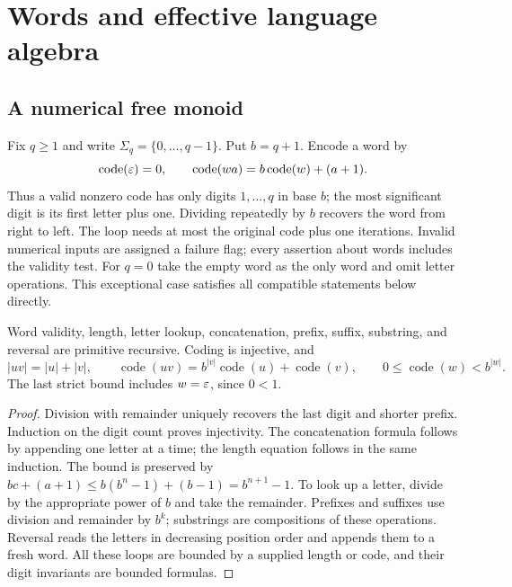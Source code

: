 \section{Words and effective language algebra}
\label{sec:words}

\subsection{A numerical free monoid}

Fix $q\ge1$ and write $\Sigma_q=\{0,\ldots,q-1\}$. Put $b=q+1$.
Encode a word by
\[
 \operatorname{code}(\varepsilon)=0,\qquad
 \operatorname{code}(wa)=b\operatorname{code}(w)+(a+1).
\]
Thus a valid nonzero code has only digits $1,\ldots,q$ in base $b$;
the most significant digit is its first letter plus one. Dividing repeatedly
by $b$ recovers the word from right to left. The loop needs at most the
original code plus one iterations. Invalid numerical inputs are assigned
a failure flag; every assertion about words includes the validity test.
For $q=0$ take the empty word as the only word and omit letter operations.
This exceptional case satisfies all compatible statements below directly.

\begin{lemma}\label{word:code}
Word validity, length, letter lookup, concatenation, prefix, suffix,
substring, and reversal are primitive recursive. Coding is injective, and
\[
 |uv|=|u|+|v|,\qquad
 \operatorname{code}(uv)=b^{|v|}\operatorname{code}(u)+
                          \operatorname{code}(v),\qquad
 0\le\operatorname{code}(w)<b^{|w|}.
\]
The last strict bound includes $w=\varepsilon$, since $0<1$.
\end{lemma}
\begin{proof}
Division with remainder uniquely recovers the last digit and shorter prefix.
Induction on the digit count proves injectivity. The concatenation formula
follows by appending one letter at a time; the length equation follows in
the same induction. The bound is preserved by
$bc+(a+1)\le b(b^n-1)+(b-1)=b^{n+1}-1$.
To look up a letter, divide by the appropriate power of $b$ and take the
remainder. Prefixes and suffixes use division and remainder by $b^k$;
substrings are compositions of these operations. Reversal reads the letters
in decreasing position order and appends them to a fresh word. All these
loops are bounded by a supplied length or code, and their digit invariants
are bounded formulas.
\end{proof}

